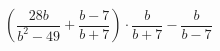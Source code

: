 \begin{ex}[type=expression]
	\begin{condition}
		\(\left( \dfrac{28b}{b^2-49}+\dfrac{b-7}{b+7} \right)\cdot\dfrac{b}{b+7}-\dfrac{b}{b-7}\)
	\end{condition}
\end{ex}
